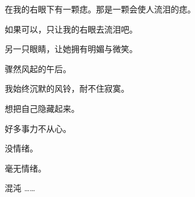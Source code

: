 		\vspace{1em}
		在我的右眼下有一颗痣。那是一颗会使人流泪的痣。\par
		如果可以，只让我的右眼去流泪吧。\par
		另一只眼睛，让她拥有明媚与微笑。

		\vspace{1em}
		骤然风起的午后。\par
		我始终沉默的风铃，耐不住寂寞。

	\endwriting



		想把自己隐藏起来。\par
		好多事力不从心。\par
		没情绪。\par
		毫无情绪。\par
		混沌 ……

	\endwriting

